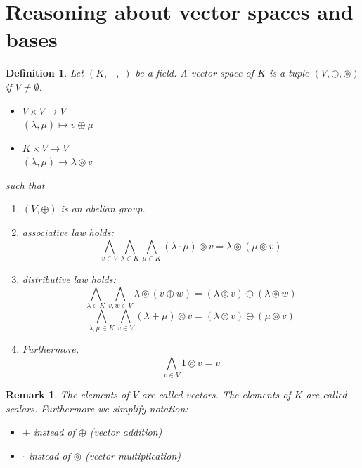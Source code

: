\documentclass[a4paper,landscape,twocolumn]{article}
\newtheorem{defi}{Definition}
\newtheorem{rem}{Remark}
\begin{document}
\section{Reasoning about vector spaces and bases}

\begin{defi}
  Let $(K, +, \cdot)$ be a field.
  A vector space of $K$ is a tuple $(V, \oplus, \circledcirc)$
  if $V \neq \emptyset$.
  \begin{itemize}
    \item
      $V \times V \rightarrow V$ \\
      $(\lambda, \mu) \mapsto v \oplus \mu$
    \item
      $K \times V \rightarrow V$ \\
      $(\lambda, \mu) \rightarrow \lambda \circledcirc v$
  \end{itemize}
  such that
  \begin{enumerate}
    \item $(V, \oplus)$ is an abelian group.
    \item associative law holds:
      \[
        \bigwedge_{v \in V} \bigwedge_{\lambda \in K} \bigwedge_{\mu \in K} (\lambda \cdot \mu) \circledcirc v
        = \lambda \circledcirc (\mu \circledcirc v)
      \]
    \item distributive law holds:
      \[
        \bigwedge_{\lambda \in K} \bigwedge_{v,w \in V} \lambda \circledcirc (v \oplus w) = (\lambda \circledcirc v) \oplus (\lambda \circledcirc w)
      \] \[
        \bigwedge_{\lambda, \mu \in K} \bigwedge_{v \in V} (\lambda + \mu) \circledcirc v = (\lambda \circledcirc v) \oplus (\mu \circledcirc v)
      \]
    \item Furthermore,
      \[ \bigwedge_{v \in V} 1 \circledcirc v = v \]
  \end{enumerate}
\end{defi}

\begin{rem}
  The elements of $V$ are called \emph{vectors}.
  The elements of $K$ are called \emph{scalars}.
  Furthermore we simplify notation:
  \begin{itemize}
    \item $+$ instead of $\oplus$ (vector addition)
    \item $\cdot$ instead of $\circledcirc$ (vector multiplication)
  \end{itemize}
\end{rem}
\end{document}
